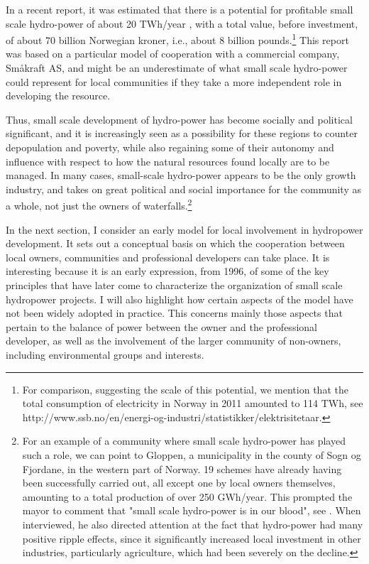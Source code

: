 In a recent report, it was estimated that there is a potential for profitable small scale hydro-power of about 20 TWh/year \cite{Aanesland}, with a total value, before investment, of about 70 billion Norwegian kroner, i.e., about 8 billion pounds.\footnote{For comparison, suggesting the scale of this potential, we mention that the total consumption of electricity in Norway in 2011 amounted to 114 TWh, see http://www.ssb.no/en/energi-og-industri/statistikker/elektrisitetaar.}  This report was based on a particular model of cooperation with a commercial company, Småkraft AS, and might be an underestimate of what small scale hydro-power could represent for local communities if they take a more independent role in developing the resource. 

Thus, small scale development of hydro-power has become socially and political significant, and it is increasingly seen as a possibility for these regions to counter depopulation and poverty, while also regaining some of their autonomy and influence with respect to how the natural resources found locally are to be managed. In many cases, small-scale hydro-power appears to be the only growth industry, and takes on great political and social importance for the community as a whole, not just the owners of waterfalls.\footnote{For an example of a community where small scale hydro-power has played such a role, we can point to Gloppen, a municipality in the county of Sogn og Fjordane, in the western part of Norway. 19 schemes have already having been successfully carried out, all except one by local owners themselves, amounting to a total production of over 250 GWh/year. This prompted the mayor to comment that "small scale hydro-power is in our blood", see \cite{Gloppen}. When interviewed, he also directed attention at the fact that hydro-power had many positive ripple effects, since it significantly increased local investment in other industries, particularly agriculture, which had been severely on the decline.}

In the next section, I consider an early model for local involvement in hydropower development. It sets out a conceptual basis on which the cooperation between local owners, communities and professional developers can take place. It is interesting because it is an early expression, from 1996, of some of the key principles that have later come to characterize the organization of small scale hydropower projects. I will also highlight how certain aspects of the model have not been widely adopted in practice. This concerns mainly those aspects that pertain to the balance of power between the owner and the professional developer, as well as the involvement of the larger community of non-owners, including environmental groups and interests. 


